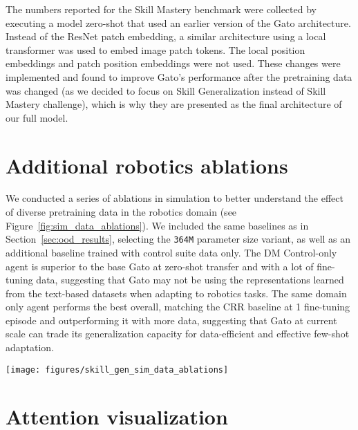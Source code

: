 \documentclass[10pt]{article} \usepackage[accepted]{tmlr}
\newcommand{\model}{{Gato}}
\begin{document}
The numbers reported for the Skill Mastery benchmark were collected by executing a model zero-shot that used an earlier version of the \model{} architecture. Instead of the ResNet patch embedding, a similar architecture using a local transformer was used to embed image patch tokens. The local position embeddings and patch position embeddings were not used. These changes were implemented and found to improve \model{}'s performance after the pretraining data was changed (as we decided to focus on Skill Generalization instead of Skill Mastery challenge), which is why they are presented as the final architecture of our full model.

\clearpage
\section{Additional robotics ablations}
\label{sec:sim_ablations_appendix}

We conducted a series of ablations in simulation to better understand the effect of diverse pretraining data in the robotics domain (see Figure~\ref{fig:sim_data_ablations}). We included the same baselines as in Section~\ref{sec:ood_results}, selecting the \texttt{364M} parameter size variant, as well as an additional baseline trained with control suite data only.
The DM Control-only agent is superior to the base \model{} at zero-shot transfer and with a lot of fine-tuning data, suggesting that \model{} may not be using the representations learned from the text-based datasets when adapting to robotics tasks. The same domain only agent performs the best overall, matching the CRR baseline at 1 fine-tuning episode and outperforming it with more data, suggesting that \model{} at current scale can trade its generalization capacity for data-efficient and effective few-shot adaptation. 


\begin{figure*}[t]
    \texttt{[image: figures/skill\_gen\_sim\_data\_ablations]}    
    \caption{{\bf Few-shot performance of \model{} for Skill Generalization in simulation.} Each test set object is plotted separately. We ablate over different pretraining datasets.
    \label{fig:sim_data_ablations}}
\end{figure*}

\section{Attention visualization} \label{attention_appendix}
\end{document}
